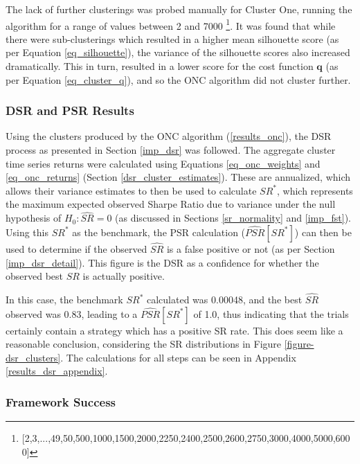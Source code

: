\documentclass[a4paper,11pt,oneside]{article}
\theoremstyle{plain}
\theoremstyle{definition}
\begin{document}
	The lack of further clusterings was probed manually for Cluster One, running the algorithm for a range of values between 2 and 7000 \footnote{[2,3,...,49,50,500,1000,1500,2000,2250,2400,2500,2600,2750,3000,4000,5000,6000]}. It was found that while there were sub-clusterings which resulted in a higher mean silhouette score (as per Equation \ref{eq_silhouette}), the variance of the silhouette scores also increased dramatically. This in turn, resulted in a lower score for the cost function $\mathbf{q}$ (as per Equation \ref{eq_cluster_q}), and so the ONC algorithm did not cluster further.
	
	\subsubsection{DSR and PSR Results}\label{results_dsr2}
	
	Using the clusters produced by the ONC algorithm (\ref{results_onc}), the DSR process as presented in Section \ref{imp_dsr} was followed. The aggregate cluster time series returns were calculated using Equations \ref{eq_onc_weights} and \ref{eq_onc_returns} (Section \ref{dsr_cluster_estimates}). These are annualized, which allows their variance estimates to then be used to calculate $SR^*$, which represents the maximum expected observed Sharpe Ratio due to variance under the null hypothesis of $H_0:  \widehat{SR} = 0$ (as discussed in Sections \ref{sr_normality} and \ref{imp_fst}). Using this $SR^*$ as the benchmark, the PSR calculation ($\widehat{PSR}[SR^*]$) can then be used to determine if the observed $\widehat{SR}$ is a false positive or not (as per Section \ref{imp_dsr_detail}). This figure is the DSR as a confidence for whether the observed best $SR$ is actually positive. \newline
	
	In this case, the benchmark $SR^*$ calculated was 0.00048, and the best $\widehat{SR}$ observed was 0.83, leading to a $\widehat{PSR}[SR^*]$ of 1.0, thus indicating that the trials certainly contain a strategy which has a positive SR rate. This does seem like a reasonable conclusion, considering the SR distributions in Figure \ref{figure-dsr_clusters}. The calculations for all steps can be seen in Appendix \ref{results_dsr_appendix}. \newline

	\subsubsection{Framework Success}
	
\end{document}
